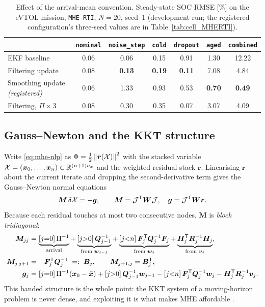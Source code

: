 \begin{table}[H]\centering
\caption{Effect of the arrival-mean convention. Steady-state SOC RMSE [\%] on the eVTOL mission,
\texttt{MHE-RTI}, $N = 20$, seed~1 (development run; the registered configuration's three-seed
values are in Table~\ref{tab:cell_MHERTI}).}
\label{tab:mhe-arrival}
\begin{tabular}{@{}lcccccc@{}}
\toprule
& \texttt{nominal} & \texttt{noise\_step} & \texttt{cold} & \texttt{dropout} & \texttt{aged} & \texttt{combined}\\
\midrule
EKF baseline        & 0.06 & 0.06 & 0.15 & 0.91 & 1.30 & 12.22 \\
Filtering update    & 0.08 & \textbf{0.13} & \textbf{0.19} & \textbf{0.11} & 7.08 & 4.84 \\
Smoothing update \emph{(registered)}
                    & 0.06 & 1.33 & 0.93 & 0.53 & \textbf{0.70} & \textbf{0.49} \\
Filtering, $\Pi\times3$ & 0.08 & 0.30 & 0.35 & 0.07 & 3.07 & 4.09 \\
\bottomrule
\end{tabular}
\end{table}

\subsection{Gauss--Newton and the KKT structure}
Write \cref{eq:mhe-nlp} as $\Phi = \tfrac12\left\lVert \bm{r}(\mathcal{X}) \right\rVert^2$ with the stacked variable
$\mathcal{X} = (\bm{x}_0,\dots,\bm{x}_n)\in\mathbb{R}^{(n+1)n_x}$ and the weighted residual stack $\bm{r}$.
Linearising $\bm{r}$ about the current iterate and dropping the second-derivative term gives the
Gauss--Newton normal equations \citep[\S10.3]{nocedal2006}
\begin{equation}\label{eq:mhe-normal}
\bm{M}\,\delta\mathcal{X} = -\bm{g},\qquad \bm{M} = \mathcal{J}^{\mathsf{T}}\bm{W}\mathcal{J},\quad \bm{g} = \mathcal{J}^{\mathsf{T}}\bm{W}\bm{r} .
\end{equation}
Because each residual touches at most two consecutive nodes, $\bm{M}$ is \emph{block tridiagonal}:
\begin{align}
\bm{M}_{jj} &= \underbrace{[j{=}0]\,\Pi^{-1}}_{\text{arrival}}
          + \underbrace{[j{>}0]\,\bm{Q}_{j-1}^{-1}}_{\text{from } \bm{w}_{j-1}}
          + \underbrace{[j{<}n]\,\bm{F}_j^{\mathsf{T}}\bm{Q}_j^{-1}\bm{F}_j}_{\text{from } \bm{w}_j}
          + \underbrace{\bm{H}_j^{\mathsf{T}}\bm{R}_j^{-1}\bm{H}_j}_{\text{from } \bm{v}_j}, \label{eq:mhe-A}\\
\bm{M}_{j,j+1} &= -\bm{F}_j^{\mathsf{T}}\bm{Q}_j^{-1} \;=:\; \bm{B}_j, \qquad \bm{M}_{j+1,j} = \bm{B}_j^{\mathsf{T}},
\label{eq:mhe-B}\\
\bm{g}_j &= [j{=}0]\,\Pi^{-1}(\bm{x}_0-\bar{\bm{x}}) + [j{>}0]\,\bm{Q}_{j-1}^{-1}\bm{w}_{j-1}
        - [j{<}n]\,\bm{F}_j^{\mathsf{T}}\bm{Q}_j^{-1}\bm{w}_j - \bm{H}_j^{\mathsf{T}}\bm{R}_j^{-1}\bm{v}_j .
\label{eq:mhe-g}
\end{align}
This banded structure is the whole point: the KKT system of a moving-horizon problem is never
dense, and exploiting it is what makes MHE affordable \citep{wangboyd2010fastmpc}.

